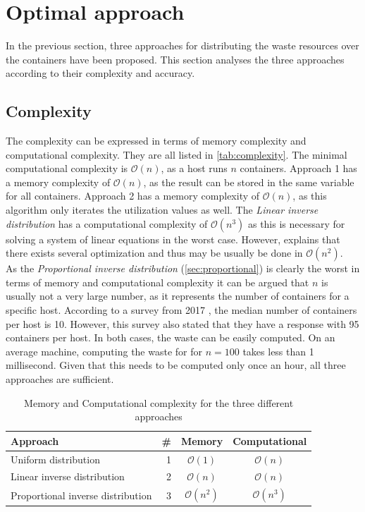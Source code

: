 \section{Optimal approach} \label{sec:optimal_approach}
In the previous section, three approaches for distributing the waste resources over the containers have been proposed.
This section analyses the three approaches according to their complexity and accuracy. 

\subsection{Complexity}
The complexity can be expressed in terms of memory complexity and computational complexity. They are all listed in \autoref{tab:complexity}. The minimal computational complexity is $\mathcal{O}(n)$, as a host runs $n$ containers. Approach 1 has a memory complexity of $\mathcal{O}(n)$, as the result can be stored in the same variable for all containers. Approach 2 has a memory complexity of $\mathcal{O}(n)$, as this algorithm only iterates the utilization values as well. The \textit{Linear inverse distribution} has a computational complexity of $\mathcal{O}(n^3)$ as this is necessary for solving a system of linear equations in the worst case. However, \cite{pan1991complexity} explains that there exists several optimization and thus may be usually be done in $\mathcal{O}(n^2)$.\\

\noindent
As the \textit{Proportional inverse distribution} (\autoref{sec:proportional}) is clearly the worst in terms of memory and computational complexity it can be argued that $n$ is usually not a very large number, as it represents the number of containers for a specific host. According to a survey from 2017 \cite{docker_report}, the median number of containers per host is 10. However, this survey also stated that they have a response with 95 containers per host. In both cases, the waste can be easily computed. On an average machine, computing the waste for for $n = 100$ takes less than 1 millisecond. Given that this needs to be computed only once an hour, all three approaches are sufficient.

\begin{table}
    \centering
    \begin{tabular}{l|r|c|c}
        \textbf{Approach} & \textbf{\#} & \textbf{Memory} & \textbf{Computational} \\ \hline
        Uniform distribution & 1 & $\mathcal{O}(1)$ & $\mathcal{O}(n)$ \\
        Linear inverse distribution & 2 & $\mathcal{O}(n)$ & $\mathcal{O}(n)$ \\
        Proportional inverse distribution & 3 & $\mathcal{O}(n^2)$ & $\mathcal{O}(n^3)$ \\
    \end{tabular}
    \caption{Memory and Computational complexity for the three different approaches}
    \label{tab:complexity}
\end{table}

